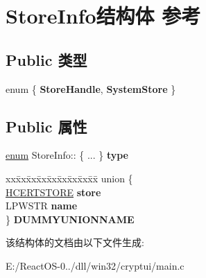 \hypertarget{struct_store_info}{}\section{Store\+Info结构体 参考}
\label{struct_store_info}
\subsection*{Public 类型}
\begin{DoxyCompactItemize}
\item 
\mbox{\label{struct_store_info_a76152785dc8bcf4fc4681ae25c36148b}} 
enum \{ {\bfseries Store\+Handle}, 
{\bfseries System\+Store}
 \}
\end{DoxyCompactItemize}
\subsection*{Public 属性}
\begin{DoxyCompactItemize}
\item 
\mbox{\label{struct_store_info_adb7f83d338c25e6ce5224cfc2f2daa95}} 
\hyperlink{interfaceenum}{enum} Store\+Info\+:: \{ ... \}  {\bfseries type}
\item 
\mbox{\label{struct_store_info_a31ef6421b132f2d7ef41cb10df6e3787}} 
\begin{tabbing}
xx\=xx\=xx\=xx\=xx\=xx\=xx\=xx\=xx\=\kill
union \{\\
\>\hyperlink{interfacevoid}{HCERTSTORE} {\bfseries store}\\
\>LPWSTR {\bfseries name}\\
\} {\bfseries DUMMYUNIONNAME}\\

\end{tabbing}\end{DoxyCompactItemize}


该结构体的文档由以下文件生成\+:\begin{DoxyCompactItemize}
\item 
E\+:/\+React\+O\+S-\/0../dll/win32/cryptui/main.\+c\end{DoxyCompactItemize}
